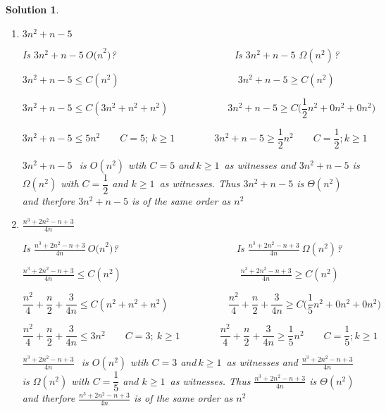 \documentclass{article}
\newtheorem{solution}[theorem]{Solution}
\begin{document}
\begin{solution}
\begin{enumerate}
$\qquad 3^{n}\not\leq n^{2}$ for all values of $C\geq 0$ and $k\geq 0\qquad
3^{n}\geq n^{2}\qquad C=1;\ k\geq 0$

\qquad $3^{n}~$\ is not $O(n^{2})$ because there are no witnesses that
satisify that but $3^{n}$ is  $\Omega (n^{2})$  with $C=1$ and $k\geq 0$ as
witnesses. Thus $3^{n}$ is not $\Theta (n^{2})$ and therfore $3^{n}$ is not
of the same order as $n^{2}$

\item $3n^{2}+n-5$

\qquad Is $3n^{2}+n-5{\ O(n}^{2})$?$\qquad \qquad \qquad \qquad \qquad
\qquad $Is $3n^{2}+n-5$ $\Omega (n^{2})$?

\qquad $3n^{2}+n-5\leq C(n^{2})\qquad \qquad \qquad \qquad \qquad \qquad
3n^{2}+n-5\geq C(n^{2})$

\qquad $3n^{2}+n-5\leq C(3n^{2}+n^{2}+n^{2})\qquad \qquad \qquad
3n^{2}+n-5\geq {C(}\dfrac{1}{2}{n}^{2}+0n^{2}+0n^{2})$

\qquad $3n^{2}+n-5\leq 5n^{2}\qquad C=5;\ k\geq 1\qquad \qquad
3n^{2}+n-5\geq \dfrac{1}{2}{n}^{2}\qquad C=\dfrac{1}{2};k\geq 1$

$3n^{2}+n-5~$\ is $O(n^{2})$ wtih $C=5$ and$\ k\geq 1$\ as witnesses and $%
3n^{2}+n-5$ is $\Omega (n^{2})$ with $C=\dfrac{1}{2}$ and $k\geq 1$\ as
witnesses. Thus $3n^{2}+n-5$ is $\Theta (n^{2})$ and therfore $3n^{2}+n-5$
is of the same order as $n^{2}$

\item $\displaystyle\frac{n^{3}+2n^{2}-n+3}{4n}$

\qquad Is $\frac{n^{3}+2n^{2}-n+3}{4n}{\ O(n}^{2})$?$\qquad \qquad \qquad
\qquad \qquad \qquad $Is $\frac{n^{3}+2n^{2}-n+3}{4n}\ \Omega (n^{2})$?

\qquad $\frac{n^{3}+2n^{2}-n+3}{4n}\leq C(n^{2})\qquad \qquad \qquad \qquad
\qquad \qquad \frac{n^{3}+2n^{2}-n+3}{4n}\geq C(n^{2})$

\qquad $\dfrac{n^{2}}{4}+\dfrac{n}{2}+\dfrac{3}{4n}\leq
C(n^{2}+n^{2}+n^{2})\qquad \qquad \qquad \dfrac{n^{2}}{4}+\dfrac{n}{2}+%
\dfrac{3}{4n}\geq {C(}\dfrac{1}{5}{n}^{2}+0n^{2}+0n^{2})$

\qquad $\dfrac{n^{2}}{4}+\dfrac{n}{2}+\dfrac{3}{4n}\leq 3n^{2}\qquad C=3;\
k\geq 1\qquad \qquad \dfrac{n^{2}}{4}+\dfrac{n}{2}+\dfrac{3}{4n}\geq \dfrac{1%
}{5}{n}^{2}\qquad C=\dfrac{1}{5};k\geq 1$

$\frac{n^{3}+2n^{2}-n+3}{4n}~$\ is $O(n^{2})$ wtih $C=3$ and$\ k\geq 1$\ as
witnesses and $\frac{n^{3}+2n^{2}-n+3}{4n}$ is $\Omega (n^{2})$ with $C=%
\dfrac{1}{5}$ and $k\geq 1$\ as witnesses. Thus $\frac{n^{3}+2n^{2}-n+3}{4n}$
is $\Theta (n^{2})$ and therfore $\frac{n^{3}+2n^{2}-n+3}{4n}$ is of the
same order as $n^{2}$
\end{enumerate}
\end{solution}
\end{document}

